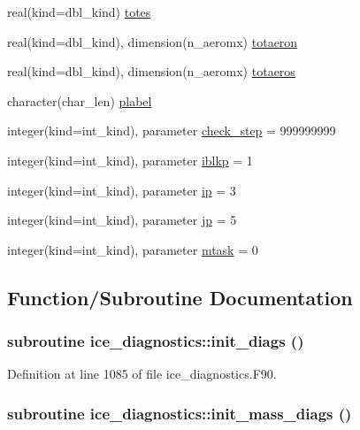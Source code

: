 \begin{DoxyCompactItemize}
\item 
real(kind=dbl\_\-kind) \hyperlink{namespaceice__diagnostics_ae008664e2d6b21a926cf781260b3c251}{totes}
\item 
real(kind=dbl\_\-kind), dimension(n\_\-aeromx) \hyperlink{namespaceice__diagnostics_ae86e38feca7ea19893e632dd3ff7a5a9}{totaeron}
\item 
real(kind=dbl\_\-kind), dimension(n\_\-aeromx) \hyperlink{namespaceice__diagnostics_a0fbcc49b04eb0b1f8ec682886abec653}{totaeros}
\item 
character(char\_\-len) \hyperlink{namespaceice__diagnostics_a155e02068d3900d95eda6c6a3a52cb9f}{plabel}
\item 
integer(kind=int\_\-kind), parameter \hyperlink{namespaceice__diagnostics_a56f414ee41003dd64ac88912858325bb}{check\_\-step} = 999999999
\item 
integer(kind=int\_\-kind), parameter \hyperlink{namespaceice__diagnostics_ac94aaaf81208df171bff46a024ccdcb1}{iblkp} = 1
\item 
integer(kind=int\_\-kind), parameter \hyperlink{namespaceice__diagnostics_a7effd9287958acac49fd0283763b7bee}{ip} = 3
\item 
integer(kind=int\_\-kind), parameter \hyperlink{namespaceice__diagnostics_a10a3f8830dada38c8bc78c01adf3e435}{jp} = 5
\item 
integer(kind=int\_\-kind), parameter \hyperlink{namespaceice__diagnostics_ad2f5352613b9b67de6d460e59a6b8bc4}{mtask} = 0
\end{DoxyCompactItemize}


\subsection{Function/Subroutine Documentation}
\hypertarget{namespaceice__diagnostics_a32eee6ddd1b9f9450d3efabd6c21a54b}{
\subsubsection[{init\_\-diags}]{\setlength{\rightskip}{0pt plus 5cm}subroutine ice\_\-diagnostics::init\_\-diags ()}}
\label{namespaceice__diagnostics_a32eee6ddd1b9f9450d3efabd6c21a54b}


Definition at line 1085 of file ice\_\-diagnostics.F90.\hypertarget{namespaceice__diagnostics_a5bf9b233f90e5bf0702b9c358a71f42d}{
\subsubsection[{init\_\-mass\_\-diags}]{\setlength{\rightskip}{0pt plus 5cm}subroutine ice\_\-diagnostics::init\_\-mass\_\-diags ()}}
\label{namespaceice__diagnostics_a5bf9b233f90e5bf0702b9c358a71f42d}


